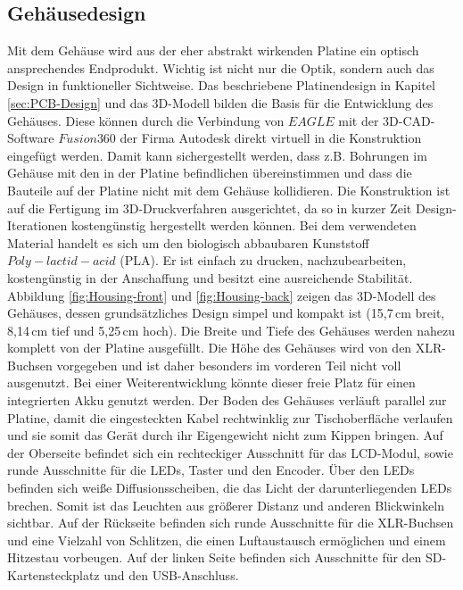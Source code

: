 
\subsection{Gehäusedesign}
Mit dem Gehäuse wird aus der eher abstrakt wirkenden Platine ein optisch ansprechendes Endprodukt. Wichtig ist nicht nur die Optik, sondern auch das Design in funktioneller Sichtweise. Das beschriebene Platinendesign in Kapitel \ref{sec:PCB-Design} und das 3D-Modell bilden die Basis für die Entwicklung des Gehäuses. Diese können durch die Verbindung von $EAGLE$ mit der 3D-CAD-Software $Fusion360$  der Firma Autodesk direkt virtuell in die Konstruktion eingefügt werden. Damit kann sichergestellt werden, dass z.B. Bohrungen im Gehäuse mit den in der Platine befindlichen übereinstimmen und dass die Bauteile auf der Platine nicht mit dem Gehäuse kollidieren. Die Konstruktion ist auf die Fertigung im 3D-Druckverfahren ausgerichtet, da so in kurzer Zeit Design-Iterationen kostengünstig hergestellt werden können. Bei dem verwendeten Material handelt es sich um den biologisch abbaubaren Kunststoff $Poly-lactid-acid$ (PLA). Er ist einfach zu drucken, nachzubearbeiten, kostengünstig in der Anschaffung und besitzt eine ausreichende Stabilität.\\
Abbildung \ref{fig:Housing-front} und \ref{fig:Housing-back} zeigen das 3D-Modell des Gehäuses, dessen grundsätzliches Design simpel und kompakt ist (15,7\,cm breit, 8,14\,cm tief und 5,25\,cm hoch). Die Breite und Tiefe des Gehäuses werden nahezu komplett von der Platine ausgefüllt. Die Höhe des Gehäuses wird von den XLR-Buchsen vorgegeben und ist daher besonders im vorderen Teil nicht voll ausgenutzt. Bei einer Weiterentwicklung könnte dieser freie Platz für einen integrierten Akku genutzt werden. Der Boden des Gehäuses verläuft parallel zur Platine, damit die eingesteckten Kabel rechtwinklig zur Tischoberfläche verlaufen und sie somit das Gerät durch ihr Eigengewicht nicht zum Kippen bringen. Auf der Oberseite befindet sich ein rechteckiger Ausschnitt für das LCD-Modul, sowie runde Ausschnitte für die LEDs, Taster und den Encoder. Über den LEDs befinden sich weiße Diffusionsscheiben, die das Licht der darunterliegenden LEDs brechen. Somit ist das Leuchten aus größerer Distanz und anderen Blickwinkeln sichtbar. Auf der Rückseite befinden sich runde Ausschnitte für die XLR-Buchsen und eine Vielzahl von Schlitzen, die einen Luftaustausch ermöglichen und einem Hitzestau vorbeugen. Auf der linken Seite befinden sich Ausschnitte für den SD-Kartensteckplatz und den USB-Anschluss.
